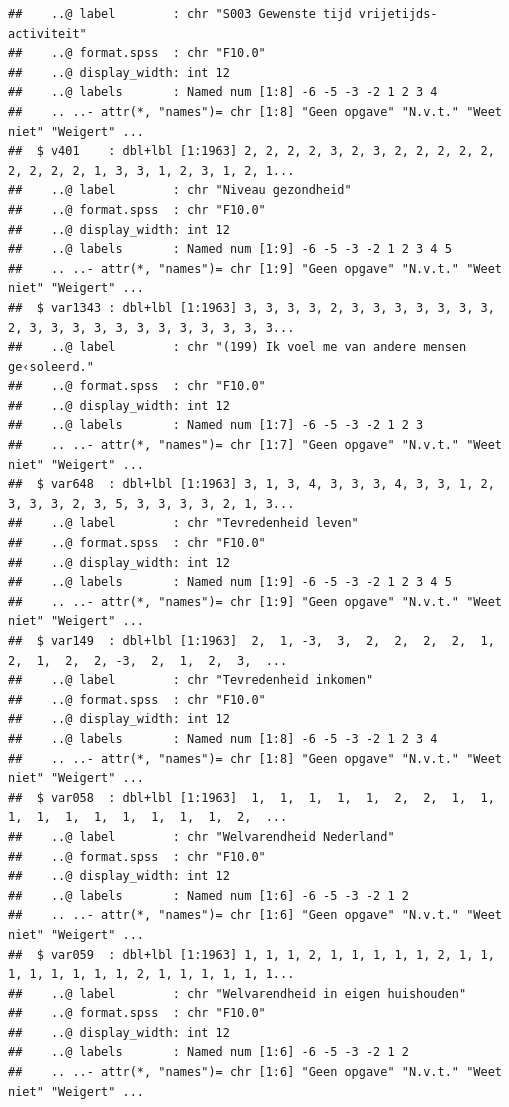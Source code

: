 \documentclass[
]{book}
\begin{document}
\begin{verbatim}
##    ..@ label        : chr "S003 Gewenste tijd vrijetijds-activiteit"
##    ..@ format.spss  : chr "F10.0"
##    ..@ display_width: int 12
##    ..@ labels       : Named num [1:8] -6 -5 -3 -2 1 2 3 4
##    .. ..- attr(*, "names")= chr [1:8] "Geen opgave" "N.v.t." "Weet niet" "Weigert" ...
##  $ v401    : dbl+lbl [1:1963] 2, 2, 2, 2, 3, 2, 3, 2, 2, 2, 2, 2, 2, 2, 2, 2, 1, 3, 3, 1, 2, 3, 1, 2, 1...
##    ..@ label        : chr "Niveau gezondheid"
##    ..@ format.spss  : chr "F10.0"
##    ..@ display_width: int 12
##    ..@ labels       : Named num [1:9] -6 -5 -3 -2 1 2 3 4 5
##    .. ..- attr(*, "names")= chr [1:9] "Geen opgave" "N.v.t." "Weet niet" "Weigert" ...
##  $ var1343 : dbl+lbl [1:1963] 3, 3, 3, 3, 2, 3, 3, 3, 3, 3, 3, 3, 2, 3, 3, 3, 3, 3, 3, 3, 3, 3, 3, 3, 3...
##    ..@ label        : chr "(199) Ik voel me van andere mensen ge‹soleerd."
##    ..@ format.spss  : chr "F10.0"
##    ..@ display_width: int 12
##    ..@ labels       : Named num [1:7] -6 -5 -3 -2 1 2 3
##    .. ..- attr(*, "names")= chr [1:7] "Geen opgave" "N.v.t." "Weet niet" "Weigert" ...
##  $ var648  : dbl+lbl [1:1963] 3, 1, 3, 4, 3, 3, 3, 4, 3, 3, 1, 2, 3, 3, 3, 2, 3, 5, 3, 3, 3, 3, 2, 1, 3...
##    ..@ label        : chr "Tevredenheid leven"
##    ..@ format.spss  : chr "F10.0"
##    ..@ display_width: int 12
##    ..@ labels       : Named num [1:9] -6 -5 -3 -2 1 2 3 4 5
##    .. ..- attr(*, "names")= chr [1:9] "Geen opgave" "N.v.t." "Weet niet" "Weigert" ...
##  $ var149  : dbl+lbl [1:1963]  2,  1, -3,  3,  2,  2,  2,  2,  1,  2,  1,  2,  2, -3,  2,  1,  2,  3,  ...
##    ..@ label        : chr "Tevredenheid inkomen"
##    ..@ format.spss  : chr "F10.0"
##    ..@ display_width: int 12
##    ..@ labels       : Named num [1:8] -6 -5 -3 -2 1 2 3 4
##    .. ..- attr(*, "names")= chr [1:8] "Geen opgave" "N.v.t." "Weet niet" "Weigert" ...
##  $ var058  : dbl+lbl [1:1963]  1,  1,  1,  1,  1,  2,  2,  1,  1,  1,  1,  1,  1,  1,  1,  1,  1,  2,  ...
##    ..@ label        : chr "Welvarendheid Nederland"
##    ..@ format.spss  : chr "F10.0"
##    ..@ display_width: int 12
##    ..@ labels       : Named num [1:6] -6 -5 -3 -2 1 2
##    .. ..- attr(*, "names")= chr [1:6] "Geen opgave" "N.v.t." "Weet niet" "Weigert" ...
##  $ var059  : dbl+lbl [1:1963] 1, 1, 1, 2, 1, 1, 1, 1, 1, 2, 1, 1, 1, 1, 1, 1, 1, 1, 2, 1, 1, 1, 1, 1, 1...
##    ..@ label        : chr "Welvarendheid in eigen huishouden"
##    ..@ format.spss  : chr "F10.0"
##    ..@ display_width: int 12
##    ..@ labels       : Named num [1:6] -6 -5 -3 -2 1 2
##    .. ..- attr(*, "names")= chr [1:6] "Geen opgave" "N.v.t." "Weet niet" "Weigert" ...

\end{verbatim}
\end{document}
